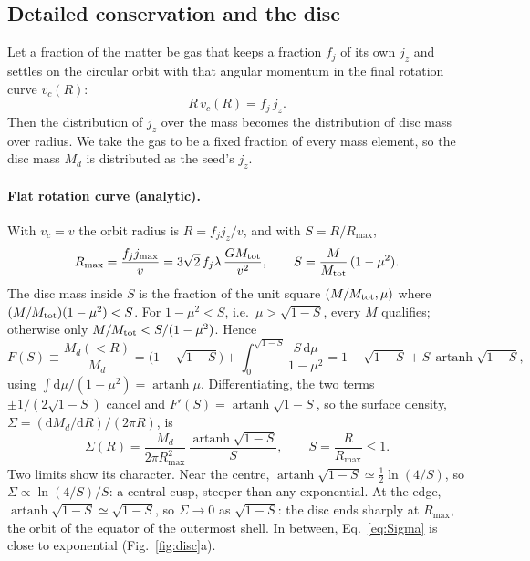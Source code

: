 \documentclass[11pt,a4paper]{article}
\newcommand{\dd}{\mathrm{d}}
\newcommand{\Rmax}{R_{\max}}
\begin{document}
\subsection{Detailed conservation and the disc}

Let a fraction of the matter be gas that keeps a fraction $f_j$ of its
own $j_z$ and settles on the circular orbit with that angular momentum in
the final rotation curve $v_c(R)$:
\begin{equation}
  R\,v_c(R)=f_j\,j_z .
  \label{eq:orbit}
\end{equation}
Then the distribution of $j_z$ over the mass becomes the distribution of
disc mass over radius. We take the gas to be a fixed fraction of every
mass element, so the disc mass $M_d$ is distributed as the seed's
$j_z$.

\paragraph{Flat rotation curve (analytic).} With $v_c=v$ the orbit
radius is $R=f_jj_z/v$, and with $S=R/\Rmax$,
\begin{equation}
  \Rmax=\frac{f_jj_{\max}}{v}=3\sqrt2\,f_j\lambda\,\frac{GM_{\rm tot}}{v^2},
  \qquad S=\frac{M}{M_{\rm tot}}\,(1-\mu^2).
\end{equation}
The disc mass inside $S$ is the fraction of the unit square
$(M/M_{\rm tot},\mu)$ where $(M/M_{\rm tot})(1-\mu^2)<S$. For
$1-\mu^2<S$, i.e.\ $\mu>\sqrt{1-S}$, every $M$ qualifies; otherwise only
$M/M_{\rm tot}<S/(1-\mu^2)$. Hence
\begin{equation}
  F(S)\equiv\frac{M_d(<R)}{M_d}
  =\bigl(1-\sqrt{1-S}\bigr)+\int_0^{\sqrt{1-S}}\frac{S\,\dd\mu}{1-\mu^2}
  =1-\sqrt{1-S}+S\,\operatorname{artanh}\sqrt{1-S},
  \label{eq:F}
\end{equation}
using $\int\dd\mu/(1-\mu^2)=\operatorname{artanh}\mu$. Differentiating,
the two terms $\pm1/(2\sqrt{1-S})$ cancel and
$F'(S)=\operatorname{artanh}\sqrt{1-S}$, so the surface density,
$\Sigma=(\dd M_d/\dd R)/(2\pi R)$, is
\begin{equation}
  \Sigma(R)=\frac{M_d}{2\pi\Rmax^2}\,
  \frac{\operatorname{artanh}\sqrt{1-S}}{S},\qquad S=\frac{R}{\Rmax}\le1 .
  \label{eq:Sigma}
\end{equation}
Two limits show its character. Near the centre,
$\operatorname{artanh}\sqrt{1-S}\simeq\tfrac12\ln(4/S)$, so
$\Sigma\propto\ln(4/S)/S$: a central cusp, steeper than any exponential.
At the edge, $\operatorname{artanh}\sqrt{1-S}\simeq\sqrt{1-S}$, so
$\Sigma\to0$ as $\sqrt{1-S}$: the disc ends sharply at $\Rmax$, the
orbit of the equator of the outermost shell. In between,
Eq.~\eqref{eq:Sigma} is close to exponential (Fig.~\ref{fig:disc}a).
\end{document}
